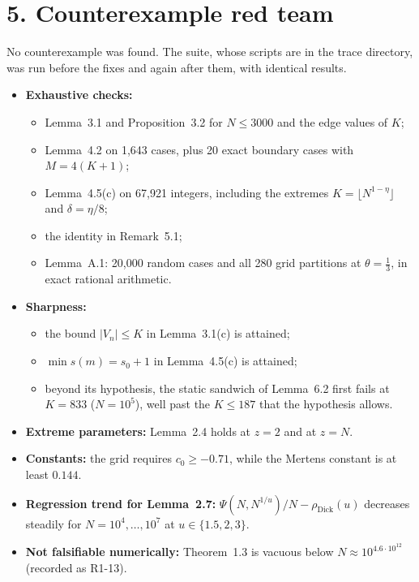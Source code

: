 \documentclass[10pt]{article}
\newcommand{\dick}{\rho_{\mathrm{Dick}}}
\begin{document}
\section*{5. Counterexample red team}
No counterexample was found. The suite, whose scripts are in the trace directory, was run before the fixes and again after them, with identical results.
\begin{itemize}\itemsep1pt
\item \textbf{Exhaustive checks:}
  \begin{itemize}\itemsep0pt
  \item Lemma~3.1 and Proposition~3.2 for $N\le3000$ and the edge values of $K$;
  \item Lemma~4.2 on 1,643 cases, plus 20 exact boundary cases with $M=4(K+1)$;
  \item Lemma~4.5(c) on 67,921 integers, including the extremes $K=\lfloor N^{1-\eta}\rfloor$ and $\delta=\eta/8$;
  \item the identity in Remark~5.1;
  \item Lemma~A.1: 20,000 random cases and all 280 grid partitions at $\theta=\frac13$, in exact rational arithmetic.
  \end{itemize}
\item \textbf{Sharpness:}
  \begin{itemize}\itemsep0pt
  \item the bound $|V_n|\le K$ in Lemma~3.1(c) is attained;
  \item $\min s(m)=s_0+1$ in Lemma~4.5(c) is attained;
  \item beyond its hypothesis, the static sandwich of Lemma~6.2 first fails at $K=833$ ($N=10^5$), well past the $K\le187$ that the hypothesis allows.
  \end{itemize}
\item \textbf{Extreme parameters:} Lemma~2.4 holds at $z=2$ and at $z=N$.
\item \textbf{Constants:} the grid requires $c_0\ge-0.71$, while the Mertens constant is at least $0.144$.
\item \textbf{Regression trend for Lemma~2.7:} $\Psi(N,N^{1/u})/N-\dick(u)$ decreases steadily for $N=10^4,\dots,10^7$ at $u\in\{1.5,2,3\}$.
\item \textbf{Not falsifiable numerically:} Theorem~1.3 is vacuous below $N\approx10^{4.6\cdot10^{12}}$ (recorded as R1-13).
\end{itemize}
\end{document}
